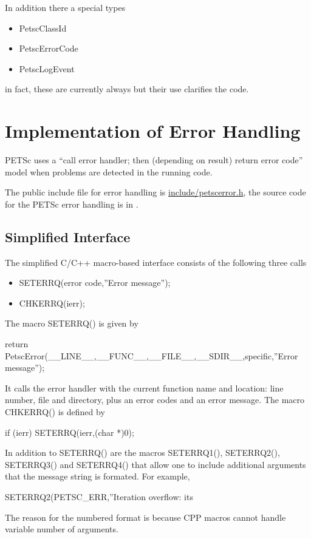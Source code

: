 \documentclass[twoside,12pt]{../sty/report_petsc}
\begin{document}
In addition there a special types
\begin{itemize}
  \item PetscClassId
  \item PetscErrorCode
  \item PetscLogEvent
\end{itemize}
in fact, these are currently always  but their use clarifies the code.

\section{Implementation of Error Handling}

PETSc  uses a ``call error handler; then (depending on result) return
error code'' model when problems are detected in the running code. 

The public include file for error handling is
 \href{http://www.mcs.anl.gov/petsc/petsc-as/snapshots/petsc-dev/include/petscerror.h.html}{include/petscerror.h}, the 
source code for the PETSc error handling is in  
.

\subsection{Simplified Interface}

The simplified C/C++ macro-based interface consists of the following three calls
\begin{itemize}
\item SETERRQ(error code,''Error message'');
\item CHKERRQ(ierr);
\end{itemize}

The macro SETERRQ() is given by 
\begin{tabbing}
return PetscError(\_\_LINE\_\_,\_\_FUNC\_\_,\_\_FILE\_\_,\_\_SDIR\_\_,specific,''Error message'');
\end{tabbing}
It calls the error handler with the current function name and location: line number,
file and directory, plus an error codes and an error message.
The macro CHKERRQ() is defined by
\begin{tabbing}
  if (ierr) SETERRQ(ierr,(char *)0);
\end{tabbing}

In addition to SETERRQ() are the macros SETERRQ1(), SETERRQ2(), SETERRQ3()
and SETERRQ4() that allow one to include additional arguments that the message
string is formated. For example,
\begin{tabbing}
  SETERRQ2(PETSC\_ERR,''Iteration overflow: its %
\end{tabbing}
The reason for the numbered format is because CPP macros cannot handle variable number
of arguments.
 
\end{document}
